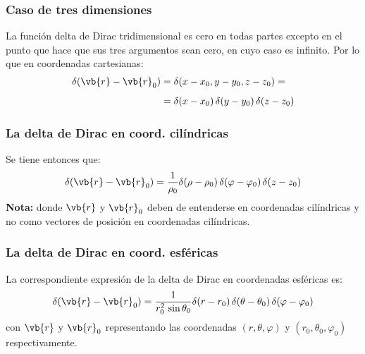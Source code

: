 \begin{frame}
\frametitle{Caso de tres dimensiones}
La función delta de Dirac tridimensional es cero en todas partes excepto en el punto que hace que sus tres argumentos sean cero, en cuyo caso es infinito.
\pause
Por lo que en coordenadas cartesianas:
\begin{align*}
\delta(\vb{r} - \vb{r}_{0}) &= \delta(x - x_{0}, y - y_{0}, z -z_{0}) = \\[0.5em]
&= \delta(x - x_{0}) \, \delta(y - y_{0}) \, \delta(z - z_{0})
\end{align*}
\end{frame}
\begin{frame}
\frametitle{La delta de Dirac en coord. cilíndricas}
Se tiene entonces que:
\begin{align*}
\delta(\vb{r} - \vb{r}_{0}) = \dfrac{1}{\rho_{0}} \delta(\rho - \rho_{0}) \, \delta( \varphi - \varphi_{0}) \, \delta(z - z_{0})
\end{align*}
\pause
\textbf{Nota:} donde $\vb{r}$ y $\vb{r}_{0}$ deben de entenderse en coordenadas cilíndricas y no como vectores de posición en coordenadas cilíndricas.
\end{frame}
\begin{frame}
\frametitle{La delta de Dirac en coord. esféricas}
La correspondiente expresión de la delta de Dirac en coordenadas esféricas es:
\begin{align*}
\delta(\vb{r} - \vb{r}_{0}) = \dfrac{1}{r_{0}^{2} \, \sin \theta_{0}} \delta(r - r_{0}) \, \delta(\theta - \theta_{0}) \,\delta( \varphi - \varphi_{0})
\end{align*}
\pause
con $\vb{r}$ y $\vb{r}_{0}$ representando las coordenadas $(r, \theta, \varphi)$ y $(r_{0}, \theta_{0}, \varphi_{0})$ respectivamente.
\end{frame}
   
